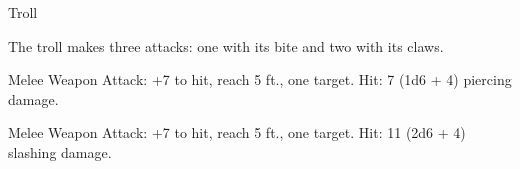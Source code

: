 \begin{monsterbox}{Troll}
\begin{monsteraction}
\end{monsteraction}
\begin{monsteraction}[Multiattack]
The troll makes three attacks: one with its bite and two with its claws.
\end{monsteraction}
\begin{monsteraction}[Bite]
Melee Weapon Attack: +7 to hit, reach 5 ft., one target. Hit: 7 (1d6 + 4) piercing damage.
\end{monsteraction}
\begin{monsteraction}[Claw]
Melee Weapon Attack: +7 to hit, reach 5 ft., one target. Hit: 11 (2d6 + 4) slashing damage.
\end{monsteraction}
\end{monsterbox}